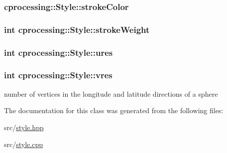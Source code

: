\hypertarget{classcprocessing_1_1Style_a23b32198997fa6b8da302adf7810f79b}{
\subsubsection[{stroke\-Color}]{ {\bf cprocessing\-::\-Style\-::stroke\-Color}}}\label{classcprocessing_1_1Style_a23b32198997fa6b8da302adf7810f79b}
\hypertarget{classcprocessing_1_1Style_a94d3946ede16f831add95bc8b51b593c}{
\subsubsection[{stroke\-Weight}]{\setlength{\rightskip}{0pt plus 5cm}int {\bf cprocessing\-::\-Style\-::stroke\-Weight}}}\label{classcprocessing_1_1Style_a94d3946ede16f831add95bc8b51b593c}
\hypertarget{classcprocessing_1_1Style_a273318013798fe01a929a718089bcd41}{
\subsubsection[{ures}]{\setlength{\rightskip}{0pt plus 5cm}int {\bf cprocessing\-::\-Style\-::ures}}}\label{classcprocessing_1_1Style_a273318013798fe01a929a718089bcd41}
\hypertarget{classcprocessing_1_1Style_a84582322d95a21a724c07d9c4aea0ca9}{
\subsubsection[{vres}]{\setlength{\rightskip}{0pt plus 5cm}int {\bf cprocessing\-::\-Style\-::vres}}}\label{classcprocessing_1_1Style_a84582322d95a21a724c07d9c4aea0ca9}


number of vertices in the longitude and latitude directions of a sphere 



\-The documentation for this class was generated from the following files\-:\begin{DoxyCompactItemize}
\item 
src/\hyperlink{style_8hpp}{style.\-hpp}\item 
src/\hyperlink{style_8cpp}{style.\-cpp}\end{DoxyCompactItemize}
